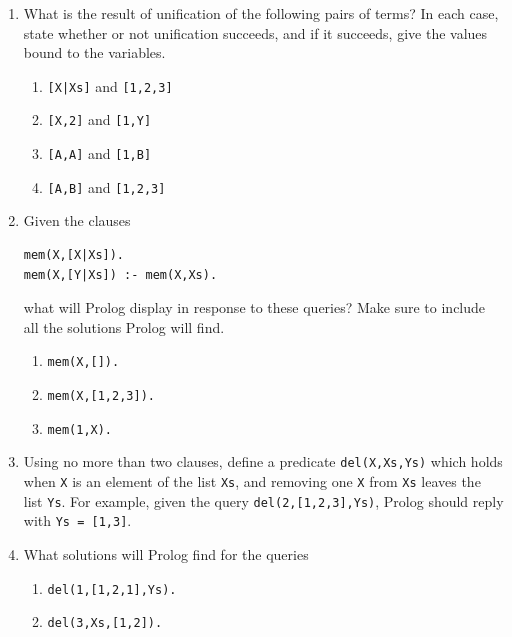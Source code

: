 \documentclass{article}
\begin{document}
\begin{enumerate}
\item
What is the result of unification of the following pairs of terms? In
each case, state whether or not unification succeeds, and if it
succeeds, give the values bound to the variables.  
\begin{enumerate}
\item
\verb![X|Xs]! and \verb![1,2,3]!
\item
\verb![X,2]! and \verb![1,Y]!
\item
\verb![A,A]! and \verb![1,B]!
\item
\verb![A,B]! and \verb![1,2,3]!
\end{enumerate}

\item
Given the clauses
\begin{verbatim}
mem(X,[X|Xs]).
mem(X,[Y|Xs]) :- mem(X,Xs).
\end{verbatim}
what will Prolog display in response to these queries? Make sure to
include all the solutions Prolog will find.
\begin{enumerate}
\item \verb!mem(X,[]).!
\item \verb!mem(X,[1,2,3]).!
\item \verb!mem(1,X).!
\end{enumerate}

\item
Using no more than two clauses, define a predicate \verb!del(X,Xs,Ys)!
which holds when \verb!X! is an element of the list \verb!Xs!, and
removing one \verb!X! from \verb!Xs! leaves the list \verb!Ys!. For
example, given the query \verb!del(2,[1,2,3],Ys)!, Prolog should reply
with \verb!Ys = [1,3]!.

\item
What solutions will Prolog find for the queries
\begin{enumerate}
\item
\verb!del(1,[1,2,1],Ys).!
\item
\verb!del(3,Xs,[1,2]).!
\end{enumerate}


\end{enumerate}
\end{document}
